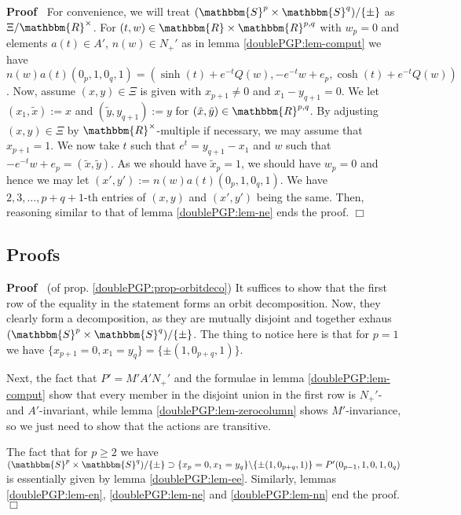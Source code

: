 \documentclass{article}
\newcommand{\assign}{:=}
\renewenvironment{proof}{\noindent\textbf{Proof\ }}{\hspace*{\fill}$\Box$\medskip}
\theoremstyle{remark}
\begin{document}
\begin{proof}
  For convenience, we will treat $(\mathbbm{S}^p \times \mathbbm{S}^q) / \{
  \pm \}$ as $\Xi /\mathbbm{R}^{\times}$. For $(t, w) \in \mathbbm{R} \times
  \mathbbm{R}^{p, q}$ with $w_p = 0$ and elements $a (t) \in A'$, $n (w) \in
  N_+'$ as in lemma \ref{doublePGP:lem-comput} we have $n (w) a (t) (0_p, 1,
  0_q, 1) = (\sinh (t) + e^{- t} Q (w), - e^{- t} w + e_p, \cosh (t) + e^{- t}
  Q (w))$. Now, assume $(x, y) \in \Xi$ is given with $x_{p + 1} \neq 0$ and
  $x_1 - y_{q + 1} = 0$. We let $(x_1, \tilde{x}) \assign x$ and $(\tilde{y},
  y_{q + 1}) \assign y$ for $(\tilde{x}, \tilde{y}) \in \mathbbm{R}^{p, q}$.
  By adjusting $(x, y) \in \Xi$ by $\mathbbm{R}^{\times}$-multiple if
  necessary, we may assume that $x_{p + 1} = 1$. We now take $t$ such that
  $e^t = y_{q + 1} - x_1$ and $w$ such that $- e^{- t} w + e_p = (\tilde{x},
  \tilde{y})$. As we should have $\tilde{x}_p = 1$, we should have $w_p = 0$
  and hence we may let $(x', y') \assign n (w) a (t) (0_p, 1, 0_q, 1)$. We
  have $2, 3, \ldots, p + q + 1$-th entries of $(x, y)$ and $(x', y')$ being
  the same. Then, reasoning similar to that of lemma \ref{doublePGP:lem-ne}
  ends the proof.
\end{proof}

\subsection{Proofs}

\begin{proof}
  (of prop. \ref{doublePGP:prop-orbitdeco}) It suffices to show that the first
  row of the equality in the statement forms an orbit decomposition. Now, they
  clearly form a decomposition, as they are mutually disjoint and together
  exhaus $(\mathbbm{S}^p \times \mathbbm{S}^q) / \{ \pm \}$. The thing to
  notice here is that for $p = 1$ we have $\{ x_{p + 1} = 0, x_1 = y_q \} = \{
  \pm (1, 0_{p + q}, 1) \}$.
  
  Next, the fact that $P' = M' A' N_+'$ and the formulae in lemma
  \ref{doublePGP:lem-comput} show that every member in the disjoint union in
  the first row is $N_+'$- and $A'$-invariant, while lemma
  \ref{doublePGP:lem-zerocolumn} shows $M'$-invariance, so we just need to
  show that the actions are transitive.
  
  The fact that for $p \geqslant 2$ we have $(\mathbbm{S}^p \times
  \mathbbm{S}^q) / \{ \pm \} \supset \{ x_p = 0, x_1 = y_q \} \backslash \{
  \pm (1, 0_{p + q}, 1) \} = P' (0_{p - 1}, 1, 0, 1, 0_q)$ is essentially
  given by lemma \ref{doublePGP:lem-ee}. Similarly, lemmas
  \ref{doublePGP:lem-en}, \ref{doublePGP:lem-ne} and \ref{doublePGP:lem-nn}
  end the proof.
\end{proof}
\end{document}
